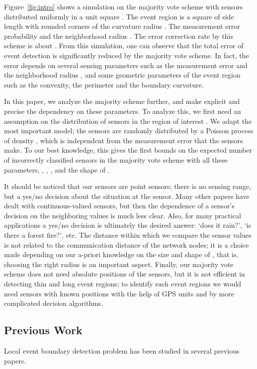\documentclass{article}
\begin{document}
\par
Figure~\ref{fig:intro} shows a simulation on the majority vote scheme
with  sensors distributed uniformly in a unit square . The
event region  is a square of side length  with rounded corners of the curvature radius . The measurement error probability  and the neighborhood radius . The error correction rate by this scheme is about .
From this simulation, one can observe that the total error of event
detection is significantly reduced by the majority vote scheme. In fact,
the error depends on several sensing parameters such as the measurement
error  and the neighborhood radius , and some geometric parameters
of the event region  such as the convexity, the perimeter and the
boundary curvature.

In this paper, we analyze the majority scheme
further, and make explicit and precise the dependency on these parameters. To analyze this, we first need an assumption on the distribution of sensors in the region of interest . We adapt the most important model; the sensors are randomly distributed by a Poisson process of density , which is independent from the measurement error  that the sensors make. To our best knowledge, this gives the first bounds on the expected number of incorrectly classified sensors in the majority vote scheme with all these parameters, , , , and the shape of .

\par
It should be noticed that our sensors are point sensors; there is
no sensing range, but a yes/no decision about the situation at the sensor.
Many other papers have dealt with continuous-valued sensors, but then the dependence of a sensor's decision on the neighboring values is much less clear. Also, for many practical applications a yes/no decision is ultimately the
desired answer: `does it rain?', `is there a forest fire?', etc.
The distance  within which we compare the sensor values is
not related to the communication distance of the network nodes;
it is a choice made depending on our a-priori knowledge on the
size and shape of , that is, choosing the right radius  is an important aspect.
Finally, our majority vote scheme does not need absolute positions
of the sensors, but it is not efficient in detecting thin and long event regions; to identify such event regions we would need sensors with
known positions with the help of GPS units and by more complicated decision algorithms.

\subsection{Previous Work}
Local event boundary detection problem has been studied in several previous papers.
\end{document}
